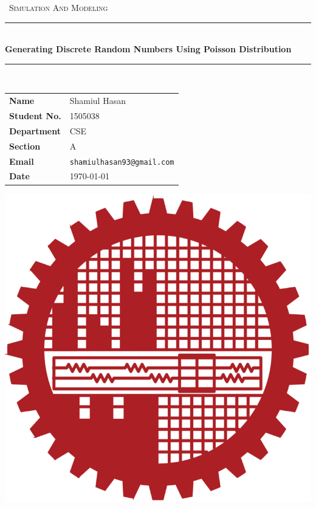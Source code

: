 \documentclass[12pt,english, openany]{article}
\begin{document}

\begin{titlepage}
	\clearpage\thispagestyle{empty}
	\centering
	\vspace{1cm}

	{\
		\textsc{Simulation And Modeling}
	}
		\vspace{2.5cm}
		
	\rule{\linewidth}{2mm} \\[0.5cm]
	{ \Huge \bfseries Generating Discrete Random Numbers Using Poisson Distribution}\\[0.5cm]
	\rule{\linewidth}{0.6mm} \\[3.4cm]

	\hspace{2cm}
		\begin{tabular}{l p{5cm}}
		\textbf{Name} & Shamiul Hasan \\[10pt]
		\textbf{Student No.} & 1505038 \\[10pt]
		\textbf{Department} & CSE \\[10pt]
		\textbf{Section} & A \\[10pt]
		\textbf{Email} & \texttt{shamiulhasan93@gmail.com} \\[10pt]
		\textbf{Date} & \today \\            
		\end{tabular}
   
    
    \vfill
    \centering \includegraphics[scale=0.23]{BUET_logo.png}\\ %
    \vspace{0.5cm}


\end{titlepage}
\end{document}
